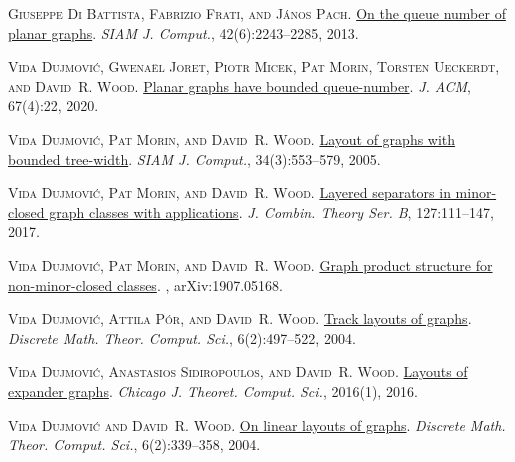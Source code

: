 \documentclass[kpfonts]{patmorin}
\begin{document}
\begin{thebibliography}{44}
	\textsc{Giuseppe {Di Battista}, Fabrizio Frati, and J\'anos Pach}.
	\newblock \href{https://doi.org/10.1137/130908051}{On the queue number of
		planar graphs}.
	\newblock \emph{SIAM J. Comput.}, 42(6):2243--2285, 2013.

	\textsc{Vida Dujmovi{\'c}, Gwena\"{e}l Joret, Piotr Micek, Pat Morin, Torsten
		Ueckerdt, and David~R. Wood}.
	\newblock \href{https://doi.org/10.1145/3385731}{Planar graphs have bounded
		queue-number}.
	\newblock \emph{J. ACM}, 67(4):22, 2020.

	\textsc{Vida Dujmovi{\'c}, Pat Morin, and David~R. Wood}.
	\newblock \href{https://doi.org/10.1137/S0097539702416141}{Layout of graphs
		with bounded tree-width}.
	\newblock \emph{SIAM J. Comput.}, 34(3):553--579, 2005.

	\textsc{Vida Dujmovi{\'c}, Pat Morin, and David~R. Wood}.
	\newblock \href{https://doi.org/10.1016/j.jctb.2017.05.006}{Layered separators
		in minor-closed graph classes with applications}.
	\newblock \emph{J. Combin. Theory Ser. B}, 127:111--147, 2017.

	\textsc{Vida Dujmovi{\'c}, Pat Morin, and David~R. Wood}.
	\newblock \href{http://arxiv.org/abs/1907.05168}{Graph product structure for
		non-minor-closed classes}.
	, arXiv:1907.05168.

	\textsc{Vida Dujmovi{\'c}, Attila P\'or, and David~R. Wood}.
	\newblock \href{http://dmtcs.episciences.org/315}{Track layouts of graphs}.
	\newblock \emph{Discrete Math. Theor. Comput. Sci.}, 6(2):497--522, 2004.

	\textsc{Vida Dujmovi{\'c}, Anastasios Sidiropoulos, and David~R. Wood}.
	\newblock \href{https://doi.org/10.4086/cjtcs.2016.001}{Layouts of expander
		graphs}.
	\newblock \emph{Chicago J. Theoret. Comput. Sci.}, 2016(1), 2016.

	\textsc{Vida Dujmovi{\'c} and David~R. Wood}.
	\newblock \href{http://dmtcs.episciences.org/317}{On linear layouts of graphs}.
	\newblock \emph{Discrete Math. Theor. Comput. Sci.}, 6(2):339--358, 2004.


\end{thebibliography}
\end{document}
